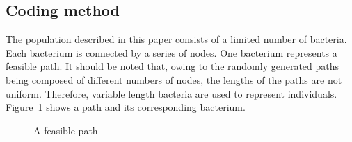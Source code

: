 \documentclass{PDS}%
\theoremstyle{definition}
\begin{document}
\subsection{Coding method}

The population described in this paper consists of a limited number of bacteria. Each
bacterium is connected by a series of nodes. One bacterium represents a feasible path. It
should be noted that, owing to the randomly generated paths being composed of different
numbers of nodes, the lengths of the paths are not uniform. Therefore, variable length
bacteria are used to represent individuals. Figure~\ref{fig:2} shows a path and its
corresponding bacterium.

\begin{figure}[h!]
\caption{A feasible path}
\label{fig:2}
\end{figure}


\end{document}
